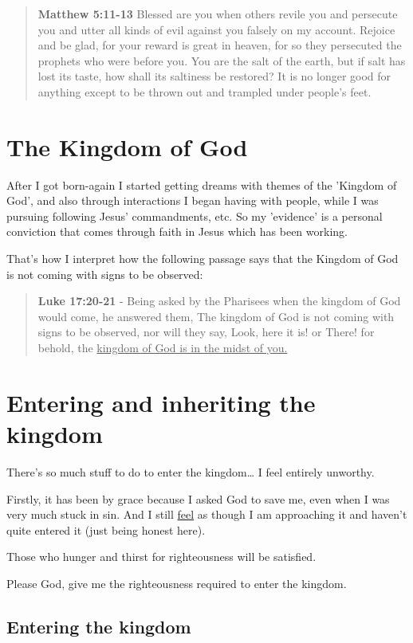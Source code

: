 \documentclass[11pt]{article}
\begin{document}
\begin{quote}
\textbf{Matthew 5:11-13}  Blessed are you when others revile you and persecute you and utter all kinds of evil against you falsely on my account. Rejoice and be glad, for your reward is great in heaven, for so they persecuted the prophets who were before you. You are the salt of the earth, but if salt has lost its taste, how shall its saltiness be restored? It is no longer good for anything except to be thrown out and trampled under people's feet.
\end{quote}

\section{The Kingdom of God}
\label{sec:org30ab188}
After I got born-again I started getting dreams with themes of the 'Kingdom of God', and also through interactions I began having with people, while I was pursuing following Jesus' commandments, etc. So my 'evidence' is a personal conviction that comes through faith in Jesus which has been working.

That's how I interpret how the following passage says that the Kingdom of God is not coming with signs to be observed:

\begin{quote}
\textbf{Luke 17:20-21} - Being asked by the Pharisees when the kingdom of God would come, he answered them, The kingdom of God is not coming with signs to be observed, nor will they say, Look, here it is! or There! for behold, the \uline{kingdom of God is in the midst of you.}
\end{quote}

\section{Entering and inheriting the kingdom}
\label{sec:org5568af6}
There's so much stuff to do to enter the kingdom\ldots{} I feel entirely unworthy.

Firstly, it has been by grace because I asked God to save me, even when I was very much stuck in sin. And I still \uline{feel} as though I am approaching it and haven't quite entered it (just being honest here).

Those who hunger and thirst for righteousness will be satisfied.

Please God, give me the righteousness required to enter the kingdom.

\subsection{Entering the kingdom}
\label{sec:org8bd3627}
\end{document}
